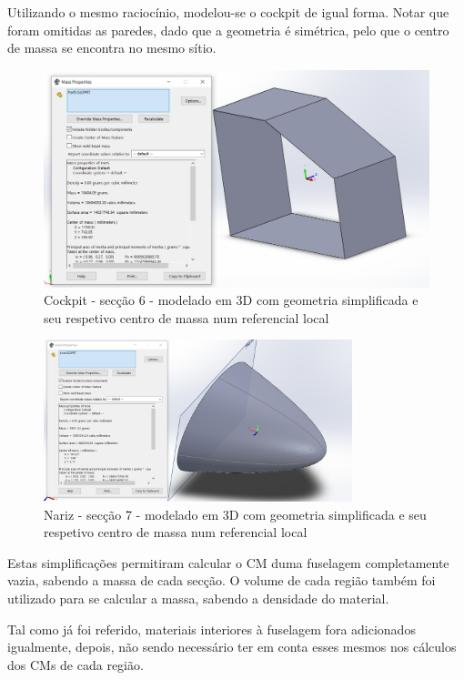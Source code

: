 \FloatBarrier
Utilizando o mesmo raciocínio, modelou-se o cockpit de igual forma. Notar que foram omitidas as paredes, dado que a geometria é simétrica, pelo que o centro de massa se encontra no mesmo sítio. 
\FloatBarrier
\begin{figure}[h]
    \centering
    \includegraphics[width=\textwidth]{Imagens/CM_cockpit_1.PNG}
    \caption{Cockpit - secção 6 - modelado em 3D com geometria simplificada e seu respetivo centro de massa num referencial local}
    \label{lig_cauda_1}
\end{figure}
\begin{figure}[h]
    \centering
    \includegraphics[width=0.80\textwidth]{Imagens/CM_nose.PNG}
    \caption{Nariz - secção 7 - modelado em 3D com geometria simplificada e seu respetivo centro de massa num referencial local}
    \label{lig_cauda_2}
\end{figure}
\FloatBarrier
Estas simplificações permitiram calcular o CM duma fuselagem completamente vazia, sabendo a massa de cada secção. O volume de cada região também foi utilizado para se calcular a massa, sabendo a densidade do material.\par
Tal como já foi referido, materiais interiores à fuselagem fora adicionados igualmente, depois, não sendo necessário ter em conta esses mesmos nos cálculos dos CMs de cada região.\par
